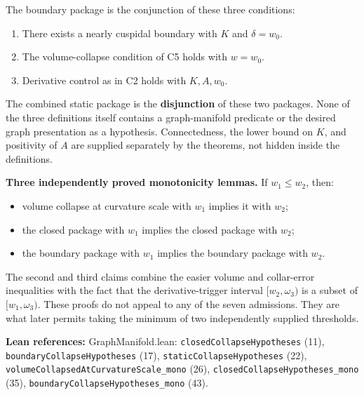 \documentclass[
  letterpaper,
  11pt]{article}
\providecommand{\tightlist}{%
  \setlength{\itemsep}{0pt}\setlength{\parskip}{0pt}}
\begin{document}
The boundary package is the conjunction of these three conditions:

\begin{enumerate}
\def\labelenumi{\arabic{enumi}.}
\tightlist
\item
  There exists a nearly cuspidal boundary with \(K\) and \(\delta=w_0\).
\item
  The volume-collapse condition of C5 holds with \(w=w_0\).
\item
  Derivative control as in C2 holds with \(K,A,w_0\).
\end{enumerate}

The combined static package is the \textbf{disjunction} of these two
packages. None of the three definitions itself contains a graph-manifold
predicate or the desired graph presentation as a hypothesis.
Connectedness, the lower bound on \(K\), and positivity of \(A\) are
supplied separately by the theorems, not hidden inside the definitions.

\textbf{Three independently proved monotonicity lemmas.} If
\(w_1\leq w_2\), then:

\begin{itemize}
\tightlist
\item
  volume collapse at curvature scale with \(w_1\) implies it with
  \(w_2\);
\item
  the closed package with \(w_1\) implies the closed package with
  \(w_2\);
\item
  the boundary package with \(w_1\) implies the boundary package with
  \(w_2\).
\end{itemize}

The second and third claims combine the easier volume and collar-error
inequalities with the fact that the derivative-trigger interval
\([w_2,\omega_3)\) is a subset of \([w_1,\omega_3)\). These proofs do
not appeal to any of the seven admissions. They are what later permits
taking the minimum of two independently supplied thresholds.

\textbf{Lean references:} GraphManifold.lean:
{\small\texttt{closed\allowbreak{}Collapse\allowbreak{}Hypotheses}}
(11),
{\small\texttt{boundary\allowbreak{}Collapse\allowbreak{}Hypotheses}}
(17),
{\small\texttt{static\allowbreak{}Collapse\allowbreak{}Hypotheses}}
(22),
{\small\texttt{volume\allowbreak{}Collapsed\allowbreak{}At\allowbreak{}Curvature\allowbreak{}Scale\_\allowbreak{}mono}}
(26),
{\small\texttt{closed\allowbreak{}Collapse\allowbreak{}Hypotheses\_\allowbreak{}mono}}
(35),
{\small\texttt{boundary\allowbreak{}Collapse\allowbreak{}Hypotheses\_\allowbreak{}mono}}
(43).
\end{document}
